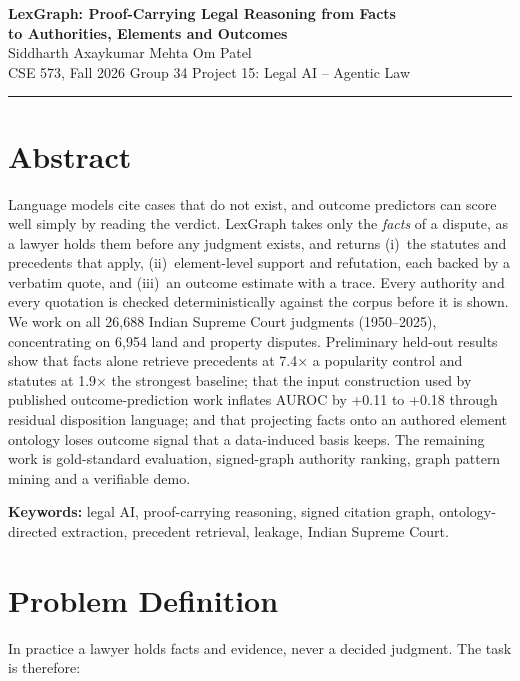 \documentclass[12pt,a4paper]{article}
\begin{document}
\begin{center}
{\bfseries\color{accent} LexGraph: Proof-Carrying Legal Reasoning from Facts\\
to Authorities, Elements and Outcomes}\\[5pt]
Siddharth Axaykumar Mehta \quad\textbullet\quad Om Patel\\[1pt]
CSE 573, Fall 2026 \quad\textbullet\quad Group 34 \quad\textbullet\quad Project 15: Legal AI -- Agentic Law
\end{center}
\vspace{-4pt}\noindent\rule{\textwidth}{0.6pt}

\section*{Abstract}
Language models cite cases that do not exist, and outcome predictors can score well simply by reading
the verdict. LexGraph takes only the \emph{facts} of a
dispute, as a lawyer holds them before any judgment exists, and returns (i)~the statutes and precedents
that apply, (ii)~element-level support and refutation, each backed by a verbatim quote, and (iii)~an
outcome estimate with a trace. Every authority and every quotation is checked deterministically against
the corpus before it is shown. We work on all 26,688 Indian Supreme Court judgments (1950--2025),
concentrating on 6,954 land and property disputes. Preliminary held-out results show that facts
alone retrieve precedents at 7.4× a popularity control and statutes at 1.9× the strongest
baseline; that the input construction used by published outcome-prediction work inflates AUROC by
+0.11 to +0.18 through residual disposition language; and that projecting facts onto an authored
element ontology loses outcome signal that a data-induced basis keeps. The remaining work is
gold-standard evaluation, signed-graph authority ranking, graph pattern mining and a verifiable demo.

\textbf{Keywords:} legal AI, proof-carrying reasoning, signed citation graph, ontology-directed
extraction, precedent retrieval, leakage, Indian Supreme Court.

\section{Problem Definition}
In practice a lawyer holds facts and evidence, never a decided judgment. The task is therefore:
\end{document}

